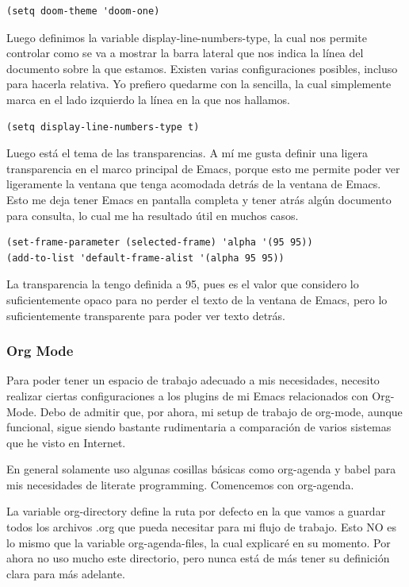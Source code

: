 \documentclass[11pt]{article}
\begin{document}
\begin{verbatim}
(setq doom-theme 'doom-one)
\end{verbatim}

Luego definimos la variable display-line-numbers-type, la cual nos permite controlar como se va a mostrar la barra lateral que nos indica la línea del documento sobre la que estamos. Existen varias configuraciones posibles, incluso para hacerla relativa. Yo prefiero quedarme con la sencilla, la cual simplemente marca en el lado izquierdo la línea en la que nos hallamos.

\begin{verbatim}
(setq display-line-numbers-type t)
\end{verbatim}

Luego está el tema de las transparencias. A mí me gusta definir una ligera transparencia en el marco principal de Emacs, porque esto me permite poder ver ligeramente la ventana que tenga acomodada detrás de la ventana de Emacs. Esto me deja tener Emacs en pantalla completa y tener atrás algún documento para consulta, lo cual me ha resultado útil en muchos casos.

\begin{verbatim}
(set-frame-parameter (selected-frame) 'alpha '(95 95))
(add-to-list 'default-frame-alist '(alpha 95 95))
\end{verbatim}

La transparencia la tengo definida a 95, pues es el valor que considero lo suficientemente opaco para no perder el texto de la ventana de Emacs, pero lo suficientemente transparente para poder ver texto detrás.
\subsubsection{Org Mode}
\label{sec:org6c45270}

Para poder tener un espacio de trabajo adecuado a mis necesidades, necesito realizar ciertas configuraciones a los plugins de mi Emacs relacionados con Org-Mode. Debo de admitir que, por ahora, mi setup de trabajo de org-mode, aunque funcional, sigue siendo bastante rudimentaria a comparación de varios sistemas que he visto en Internet.

En general solamente uso algunas cosillas básicas como org-agenda y babel para mis necesidades de literate programming. Comencemos con org-agenda.

La variable org-directory define la ruta por defecto en la que vamos a guardar todos los archivos .org que pueda necesitar para mi flujo de trabajo. Esto NO es lo mismo que la variable org-agenda-files, la cual explicaré en su momento. Por ahora no uso mucho este directorio, pero nunca está de más tener su definición clara para más adelante.
\end{document}
